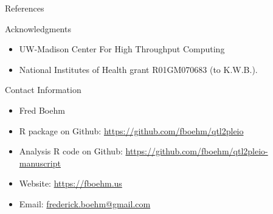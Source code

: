\documentclass[final,hyperref={pdfpagelabels=false}]{beamer}
\begin{document}
\begin{frame}[t]
\begin{columns}[t]
\begin{column}{.465\textwidth}
\begin{block}{References}
\tiny{
}

\end{block}


\begin{block}{Acknowledgments}

\begin{itemize}
  \item UW-Madison Center For High Throughput Computing 
  \item National Institutes of Health grant R01GM070683 (to K.W.B.).
\end{itemize}

\end{block}



\begin{block}{Contact Information}

\begin{itemize}
\item Fred Boehm
\item R package on Github: \href{https://github.com/fboehm/qtl2pleio}{https://github.com/fboehm/qtl2pleio}
\item Analysis R code on Github: \href{https://github.com/fboehm/qtl2pleio-manuscript}{https://github.com/fboehm/qtl2pleio-manuscript}
\item Website: \href{https://fboehm.us}{https://fboehm.us}
\item Email: \href{mailto:frederick.boehm@gmail.com}{frederick.boehm@gmail.com}
\end{itemize}

\end{block}


\end{column} %

\begin{column}{.015\textwidth}\end{column} %

\end{columns} %

\end{frame} %
\end{document}
